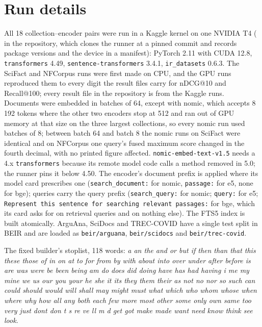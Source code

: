 \documentclass[11pt]{article}
\begin{document}
\section{Run details}
\label{app:run}
{\sloppy
All 18 collection--encoder pairs were run in a Kaggle kernel on one NVIDIA T4 ( in the repository, which clones the runner at a pinned commit and records package versions and the device in a manifest): PyTorch 2.11 with CUDA 12.8, \texttt{transformers} 4.49, \texttt{sentence-transformers} 3.4.1, \texttt{ir\_datasets} 0.6.3. The SciFact and NFCorpus runs were first made on CPU, and the GPU runs reproduced them to every digit the result files carry for nDCG@10 and Recall@100; every result file in the repository is from the Kaggle runs. Documents were embedded in batches of 64, except with nomic, which accepts 8\,192 tokens where the other two encoders stop at 512 and ran out of GPU memory at that size on the three largest collections, so every nomic run used batches of 8; between batch 64 and batch 8 the nomic runs on SciFact were identical and on NFCorpus one query's fused maximum score changed in the fourth decimal, with no printed figure affected. \texttt{nomic-embed-text-v1.5} needs a 4.x \texttt{transformers} because its remote model code calls a method removed in 5.0; the runner pins it below 4.50. The encoder's document prefix is applied where its model card prescribes one (\texttt{search\_document:} for nomic, \texttt{passage:} for e5, none for bge); queries carry the query prefix (\texttt{search\_query:} for nomic; \texttt{query:} for e5; \texttt{Represent this sentence for searching relevant passages:} for bge, which its card asks for on retrieval queries and on nothing else). The FTS5 index is built atomically. ArguAna, SciDocs and TREC-COVID have a single test split in BEIR and are loaded as \texttt{beir/arguana}, \texttt{beir/scidocs} and \texttt{beir/trec-covid}.

The fixed builder's stoplist, 118 words: \emph{a an the and or but if then than that this these those of in on at to for from by with about into over under after before is are was were be been being am do does did doing have has had having i me my mine we us our you your he she it its they them their as not no nor so such can could should would will shall may might must what which who whom whose when where why how all any both each few more most other some only own same too very just dont don t s re ve ll m d get got make made want need know think see look}.

}
\end{document}
